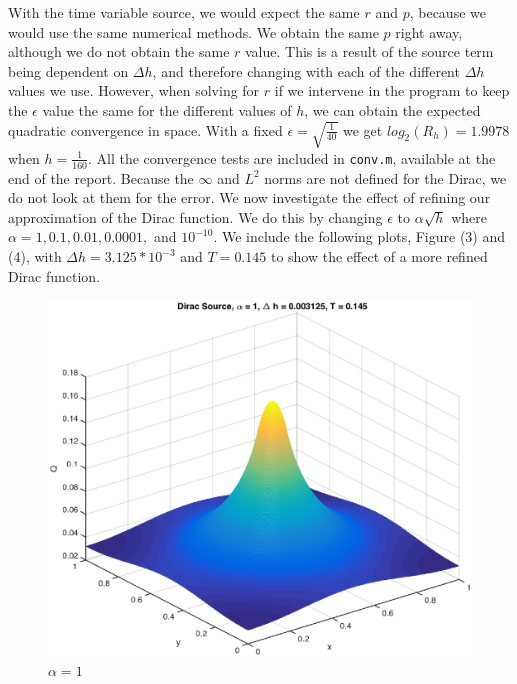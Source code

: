 With the time variable source, we would expect the same $r$ and $p$, because we would use the same numerical methods. We obtain the same $p$ right away, although we do not obtain the same $r$ value. This is a result of the source term being dependent on $\Delta h$, and therefore changing with each of the different $\Delta h$ values we use. However, when solving for $r$ if we intervene in the program to keep the $\epsilon$ value the same for the different values of $h$, we can obtain the expected quadratic convergence in space. With a fixed $\epsilon =  \sqrt{\frac{1}{40}}$ we get $log_2(R_h) = 1.9978$ when $h=\frac{1}{160}$. All the convergence tests are included in \texttt{conv.m}, available at the end of the report. 
Because the $\infty$ and $L^2$ norms are not defined for the Dirac, we do not look at them for the error. 
We now investigate the effect of refining our approximation of the Dirac function. We do this by changing $ \epsilon$ to $\alpha \sqrt{h}$ where $\alpha = 1,0.1,0.01,0.0001,$ and $10^{-10}$. 
We include the following plots, Figure (3) and (4), with $\Delta h = 3.125*10^{-3}$ and $T=0.145$ to show the effect of a more refined Dirac function. 
\begin{figure}[!htb]
\centering
\includegraphics[scale=.6]{4_2_a_1.eps}
\caption{$\alpha = 1$}
\label{fig:digraph}
\end{figure}

